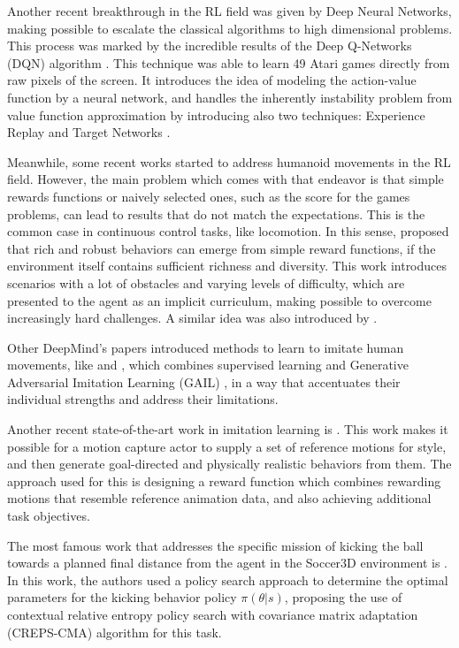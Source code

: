 Another recent breakthrough in the RL field was given by Deep Neural Networks, making possible to escalate the classical algorithms to high dimensional problems. This process was marked by the incredible results of the Deep Q-Networks (DQN) algorithm \cite{RLNature2015}. This technique was able to learn 49 Atari games directly from raw pixels of the screen. It introduces the idea of modeling the action-value function by a neural network, and handles the inherently instability problem from value function approximation by introducing also two techniques: Experience Replay \cite{ReplayBuffer} and Target Networks \cite{RLNature2015}.

Meanwhile, some recent works started to address humanoid movements in the RL field. However, the main problem which comes with that endeavor is that simple rewards functions or naively selected ones, such as the score for the games problems, can lead to results that do not match the expectations. This is the common case in continuous control tasks, like locomotion. In this sense, \cite{deepmind1} proposed that rich and robust behaviors can emerge from simple reward functions, if the environment itself contains sufficient richness and diversity. This work introduces scenarios with a lot of obstacles and varying levels of difficulty, which are presented to the agent as an implicit curriculum, making possible to overcome increasingly hard challenges. A similar idea was also introduced by \cite{BengioCurrLearning}.

Other DeepMind's papers introduced methods to learn to imitate human movements, like \cite{deepmind2} and \cite{deepmind3}, which combines supervised learning and Generative Adversarial Imitation Learning (GAIL) \cite{gail}, in a way that accentuates their individual strengths and address their limitations.

Another recent state-of-the-art work in imitation learning is \cite{deepmimic}. This work makes it possible for a motion capture actor to supply a set of reference motions for style, and then generate goal-directed and physically realistic behaviors from them. The approach used for this is designing a reward function which combines rewarding motions that resemble reference animation data, and also achieving additional task objectives.

The most famous work that addresses the specific mission of kicking the ball towards a planned final distance from the agent in the Soccer3D environment is \cite{abbas}. In this work, the authors used a policy search approach to determine the optimal parameters for the kicking behavior policy $\pi(\theta | s)$, proposing the use of contextual relative entropy policy search with covariance matrix adaptation (CREPS-CMA) algorithm for this task.

